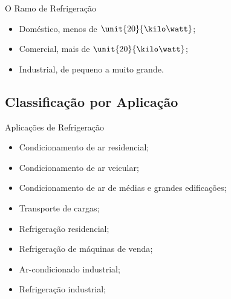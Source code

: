     \begin{frame}{O Ramo de Refrigeração}\vspace*{-0em}
        \begin{itemize}
            \item<1-> Doméstico, \alert{menos de $\unit{20}{\kilo\watt}$};
            \item<2-> Comercial, \alert{mais de $\unit{20}{\kilo\watt}$};
            \item<3-> Industrial, \alert{de pequeno a muito grande}.
        \end{itemize}
    \end{frame}

\subsection{Classificação por Aplicação}

    \begin{frame}{Aplicações de Refrigeração}\vspace*{-0em}
        \begin{itemize}
            \item<1-> Condicionamento de ar \alert{residencial};
            \item<2-> Condicionamento de ar \alert{veicular};
            \item<3-> Condicionamento de ar de médias e grandes \alert{edificações};
            \item<4-> Transporte de \alert{cargas};
            \item<5-> Refrigeração \alert{residencial};
            \item<6-> Refrigeração de \alert{máquinas de venda};
            \item<7-> Ar-condicionado \alert{industrial};
            \item<8-> Refrigeração \alert{industrial};
        \end{itemize}
    \end{frame}


